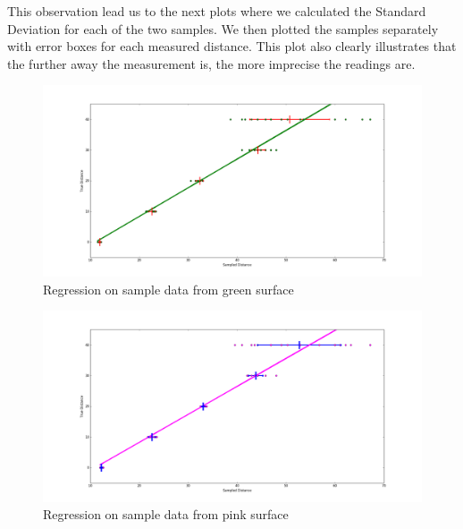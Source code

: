 \documentclass[a4paper,12pt]{article}
\begin{document}
This observation lead us to the next plots where we calculated the Standard Deviation for each of the two samples. We then plotted the samples separately with error boxes for each measured distance.   
This plot also clearly illustrates that the further away the measurement is, the more imprecise the readings are.  

\begin{figure}[!h] 
\hspace{-6cm}
\includegraphics[scale=0.5]{reg_green}
\caption{Regression on sample data from green surface}
\label{fig:green_reg}
\end{figure}
\begin{figure}[!h]
\hspace{-6cm}
\includegraphics[scale=0.5]{reg_pink}
\caption{Regression on sample data from pink surface}
\label{fig:pink_reg}
\end{figure}
\end{document}
